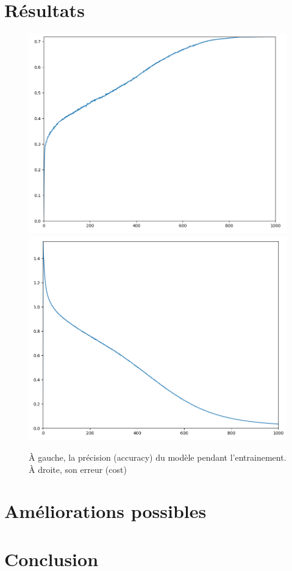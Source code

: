 \documentclass{article}
\begin{document}
\section*{Résultats}


\begin{figure}[h]
  \includegraphics[scale=0.264]{assets/acc}
  \includegraphics[scale=0.265]{assets/loss}
  
  \caption{À gauche, la précision (accuracy) du modèle pendant l'entrainement. À droite, son erreur (cost)}
  \label{acc_los}
\end{figure}

\section*{Améliorations possibles}


\section*{Conclusion}



\end{document}
